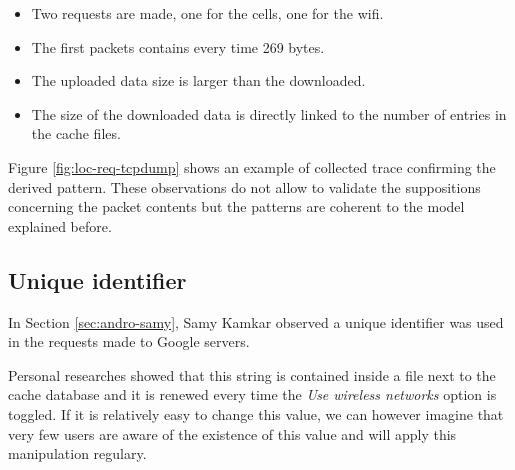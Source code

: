 \begin{itemize}
\item Two requests are made, one for the cells, one for the wifi.
\item The first packets contains every time 269 bytes.
\item The uploaded data size is larger than the downloaded.
\item The size of the downloaded data is directly linked to the number of entries in the cache files.
\end{itemize}

Figure \ref{fig:loc-req-tcpdump} shows an example of collected trace confirming the derived pattern.
These observations do not allow to validate the suppositions concerning the packet contents but the patterns are coherent to the model explained before.

\subsection{Unique identifier}

In Section \ref{sec:andro-samy}, Samy Kamkar observed a unique identifier was used in the requests made to Google servers.

Personal researches showed that this string is contained inside a file next to the cache database and it is renewed every time the \emph{Use wireless networks} option is toggled.
If it is relatively easy to change this value, we can however imagine that very few users are aware of the existence of this value and will apply this manipulation regulary.




